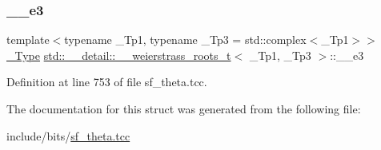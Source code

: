 \subsubsection{\texorpdfstring{\+\_\+\+\_\+e3}{\_\_e3}}
{\footnotesize\ttfamily template$<$typename \+\_\+\+Tp1, typename \+\_\+\+Tp3 = std\+::complex$<$\+\_\+\+Tp1$>$$>$ \\
\hyperlink{structstd_1_1____detail_1_1____weierstrass__roots__t_acda3e0386962aea322dea870977b67ed}{\+\_\+\+Type} \hyperlink{structstd_1_1____detail_1_1____weierstrass__roots__t}{std\+::\+\_\+\+\_\+detail\+::\+\_\+\+\_\+weierstrass\+\_\+roots\+\_\+t}$<$ \+\_\+\+Tp1, \+\_\+\+Tp3 $>$\+::\+\_\+\+\_\+e3}



Definition at line 753 of file sf\+\_\+theta.\+tcc.



The documentation for this struct was generated from the following file\+:\begin{DoxyCompactItemize}
\item 
include/bits/\hyperlink{sf__theta_8tcc}{sf\+\_\+theta.\+tcc}\end{DoxyCompactItemize}
